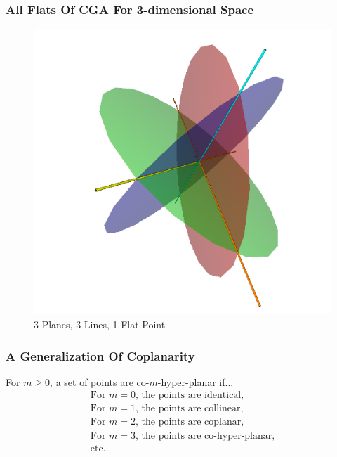 \documentclass{beamer}
\begin{document}
\begin{frame}
\frametitle{All Flats Of CGA For 3-dimensional Space}
\begin{figure}
\centering
\includegraphics[scale=0.2]{Flats}
\caption{3 Planes, 3 Lines, 1 Flat-Point}
\end{figure}
\end{frame}

\begin{frame}
\frametitle{A Generalization Of Coplanarity}
\pause
\begin{definition}
For $m\geq 0$, a set of points are \alert{co-$m$-hyper-planar} if...
\begin{equation*}
\begin{array}{l}
\mbox{For $m=0$, the points are identical,} \\
\mbox{For $m=1$, the points are collinear,} \\
\mbox{For $m=2$, the points are coplanar,} \\
\mbox{For $m=3$, the points are co-hyper-planar,} \\
\mbox{etc...}
\end{array}
\end{equation*}
\end{definition}
\end{frame}
\end{document}

